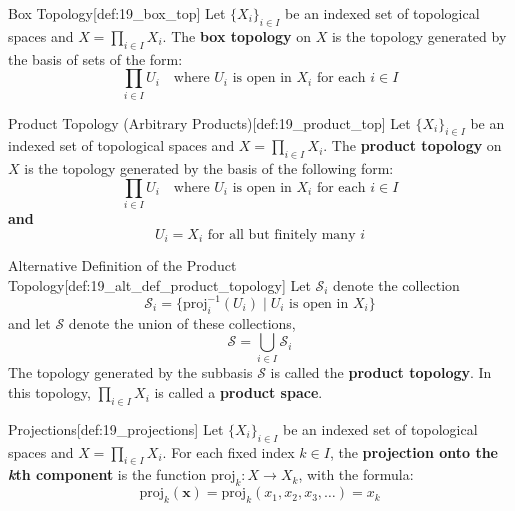 \begin{defBox}{Box Topology}[def:19_box_top]
    Let \( \{ X_{ i } \}_{ i \in I } \) be an indexed set of topological spaces
    and \( X = \prod_{ i \in I } X_{ i } \).
    The \textbf{box topology} on \( X \) is the topology generated by the basis
    of sets of the form: 
    \begin{equation*}
        \prod_{ i \in I } U_{ i }
        \quad \text{where }
        U_{ i }
        \text{ is open in }
        X_{ i } 
        \text{ for each }
        i \in I
    \end{equation*}
\end{defBox}

\begin{defBox}{Product Topology (Arbitrary Products)}[def:19_product_top]
    Let \( \{ X_{ i } \}_{ i \in I } \) be an indexed set of topological spaces
    and \( X = \prod_{ i \in I } X_{ i } \).
    The \textbf{product topology} on \( X \) is the topology generated by the 
    basis of the following form:
    \begin{equation*}
        \prod_{ i \in I } U_{ i }
        \quad \text{where }
        U_{ i }
        \text{ is open in }
        X_{ i } 
        \text{ for each }
        i \in I
    \end{equation*}
    \textbf{and}
    \begin{equation*}
        U_{ i } = X_{ i }
        \text{ for all but finitely many } i
    \end{equation*}
\end{defBox}

\begin{defBox}{Alternative Definition of the Product Topology}[def:19_alt_def_product_topology]
    Let \( \mathcal{S}_{ i } \) denote the collection
    \begin{equation*}
        \mathcal{S}_{ i } 
        =
        \{ \mathrm{proj}_{ i }^{ -1 } ( U_{ i } ) \mid U_{ i } 
        \text{ is open in } X_{ i } \}
    \end{equation*}
    and let \( \mathcal{S} \) denote the union of these collections,
    \begin{equation*}
        \mathcal{S}
        =
        \bigcup_{ i \in I } \mathcal{S}_{ i }
    \end{equation*}
    The topology generated by the subbasis \( \mathcal{S} \) is called the 
    \textbf{product topology}.
    In this topology, \( \prod_{ i \in I } X_{ i } \) is called a 
    \textbf{product space}.
\end{defBox}

\begin{defBox}{Projections}[def:19_projections]
    Let \( \{ X_{ i } \}_{ i \in I } \) be an indexed set of topological spaces
    and \( X = \prod_{ i \in I } X_{ i } \).
    For each fixed index \( k \in I \), the \textbf{projection onto the 
    \textit{k}th component} is the function \( \mathrm{proj}_{ k } : X 
    \rightarrow X_{ k } \), with the formula:
    \begin{equation*}
        \mathrm{proj}_{ k } ( \mathbf{x} )
        =
        \mathrm{proj}_{ k } ( x_{ 1 }, x_{ 2 }, x_{ 3 }, \ldots )
        =
        x_{ k }
    \end{equation*}
\end{defBox}
